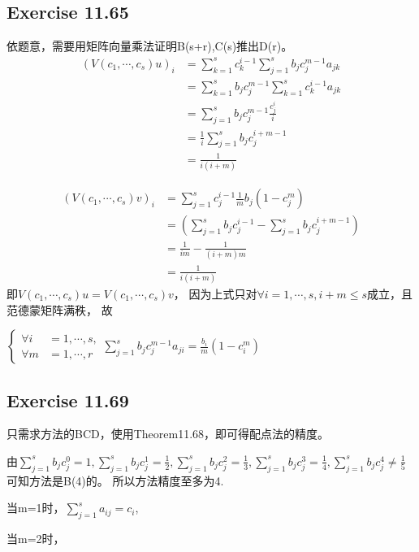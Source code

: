 \documentclass[UTF8]{ctexart}
\begin{document}
\subsection*{Exercise 11.65}
依题意，需要用矩阵向量乘法证明B(s+r),C(s)推出D(r)。
\begin{align*}
    (V(c_1,\cdots,c_s)u)_i &= \sum_{k=1}^{s}c_k^{i-1}\sum_{j=1}^{s}b_jc_j^{m-1}a_{jk} \\
                           &= \sum_{k=1}^{s}b_jc_j^{m-1}\sum_{k=1}^{s}c_k^{i-1}a_{jk} \\
                           &= \sum_{j=1}^{s}b_jc_j^{m-1}\frac{c_j^i}{i} \\
                           &= \frac{1}{i}\sum_{j=1}^{s}b_jc_j^{i+m-1}\\ 
                           &= \frac{1}{i(i+m)}
\end{align*}

\begin{align*}
    (V(c_1,\cdots,c_s)v)_i &= \sum_{j=1}^{s}c_j^{i-1}\frac{1}{m}b_j(1-c_j^m) \\
                           &= (\sum_{j=1}^{s}b_jc_j^{i-1} - \sum_{j=1}^{s}b_jc_j^{i+m-1}) \\
                           &= \frac{1}{im} - \frac{1}{(i+m)m} \\
                           &= \frac{1}{i(i+m)}
\end{align*}
即$V(c_1,\cdots,c_s)u = V(c_1,\cdots,c_s)v$，
因为上式只对$\forall i=1,\cdots,s, i+m\leq s$成立，且范德蒙矩阵满秩，
故

$\left\{
    \begin{aligned}
        \forall i& = 1,\cdots,s, \\
        \forall m& = 1,\cdots,r
    \end{aligned}
\sum_{j=1}^{s}b_jc_j^{m-1}a_{ji} = \frac{b_i}{m}(1-c_i^m)
\right.
$


\subsection*{Exercise 11.69}
只需求方法的BCD，使用Theorem11.68，即可得配点法的精度。

由$\sum_{j=1}^{s}b_jc_j^0=1, \sum_{j=1}^{s}b_jc_j^1=\frac{1}{2}, \sum_{j=1}^{s}b_jc_j^2=\frac{1}{3}, 
\sum_{j=1}^{s}b_jc_j^3=\frac{1}{4},\sum_{j=1}^{s}b_jc_j^4 \neq \frac{1}{5}$可知方法是B(4)的。
所以方法精度至多为4.

当m=1时，$\sum_{j=1}^{s}a_{ij} = c_i$,

当m=2时，
\end{document}
